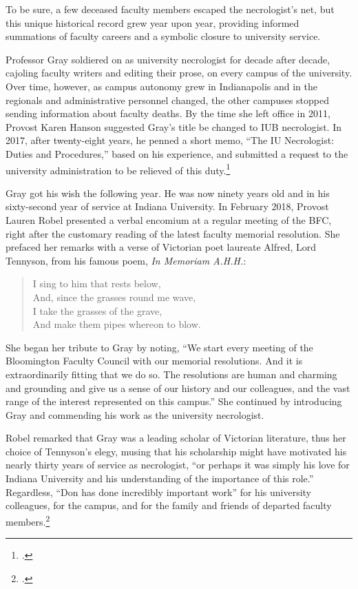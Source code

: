 \documentclass[
  american,
  letterpaper,
]{scrreprt}
\begin{document}
To be sure, a few deceased faculty members escaped the necrologist's
net, but this unique historical record grew year upon year, providing
informed summations of faculty careers and a symbolic closure to
university service.

Professor Gray soldiered on as university necrologist for decade after
decade, cajoling faculty writers and editing their prose, on every
campus of the university. Over time, however, as campus autonomy grew in
Indianapolis and in the regionals and administrative personnel changed,
the other campuses stopped sending information about faculty deaths. By
the time she left office in 2011, Provost Karen Hanson suggested Gray's
title be changed to IUB necrologist. In 2017, after twenty-eight years,
he penned a short memo, ``The IU Necrologist: Duties and Procedures,''
based on his experience, and submitted a request to the university
administration to be relieved of this duty.\footnote{.}

Gray got his wish the following year. He was now ninety years old and in
his sixty-second year of service at Indiana University. In February
2018, Provost Lauren Robel presented a verbal encomium at a regular
meeting of the BFC, right after the customary reading of the latest
faculty memorial resolution. She prefaced her remarks with a verse of
Victorian poet laureate Alfred, Lord Tennyson, from his famous poem,
\emph{In Memoriam A.H.H.}:

\begin{quote}
I sing to him that rests below,\\
And, since the grasses round me wave,\\
I take the grasses of the grave,\\
And make them pipes whereon to blow.
\end{quote}

She began her tribute to Gray by noting, ``We start every meeting of the
Bloomington Faculty Council with our memorial resolutions. And it is
extraordinarily fitting that we do so. The resolutions are human and
charming and grounding and give us a sense of our history and our
colleagues, and the vast range of the interest represented on this
campus.'' She continued by introducing Gray and commending his work as
the university necrologist.

Robel remarked that Gray was a leading scholar of Victorian literature,
thus her choice of Tennyson's elegy, musing that his scholarship might
have motivated his nearly thirty years of service as necrologist, ``or
perhaps it was simply his love for Indiana University and his
understanding of the importance of this role.'' Regardless, ``Don has
done incredibly important work'' for his university colleagues, for the
campus, and for the family and friends of departed faculty
members.\footnote{.}
\end{document}
